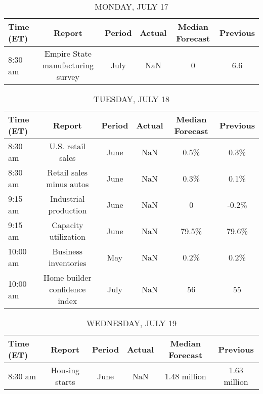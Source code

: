 \documentclass{article}%
\begin{document}
%
\normalsize%


\begin{table}[htbp]%
\caption{MONDAY, JULY 17}%
\centering%
\begin{adjustbox}{width=1\textwidth}%
\begin{tabular}{lccccc}
\toprule
Time (ET) &                            Report & Period & Actual & Median Forecast & Previous \\
\midrule
  8:30 am & Empire State manufacturing survey &   July &    NaN &               0 &      6.6 \\
\bottomrule
\end{tabular}
%
\end{adjustbox}%
\end{table}

%


\begin{table}[htbp]%
\caption{TUESDAY, JULY 18}%
\centering%
\begin{adjustbox}{width=1\textwidth}%
\begin{tabular}{lccccc}
\toprule
Time (ET) &                        Report & Period & Actual & Median Forecast & Previous \\
\midrule
  8:30 am &             U.S. retail sales &   June &    NaN &            0.5\% &     0.3\% \\
  8:30 am &      Retail sales minus autos &   June &    NaN &            0.3\% &     0.1\% \\
  9:15 am &         Industrial production &   June &    NaN &               0 &    -0.2\% \\
  9:15 am &          Capacity utilization &   June &    NaN &           79.5\% &    79.6\% \\
 10:00 am &          Business inventories &    May &    NaN &            0.2\% &     0.2\% \\
 10:00 am & Home builder confidence index &   July &    NaN &              56 &       55 \\
\bottomrule
\end{tabular}
%
\end{adjustbox}%
\end{table}

%


\begin{table}[htbp]%
\caption{WEDNESDAY, JULY 19}%
\centering%
\begin{adjustbox}{width=1\textwidth}%
\begin{tabular}{lccccc}
\toprule
Time (ET) &         Report & Period & Actual & Median Forecast &     Previous \\
\midrule
  8:30 am & Housing starts &   June &    NaN &    1.48 million & 1.63 million \\
\bottomrule
\end{tabular}
%
\end{adjustbox}%
\end{table}
\end{document}
